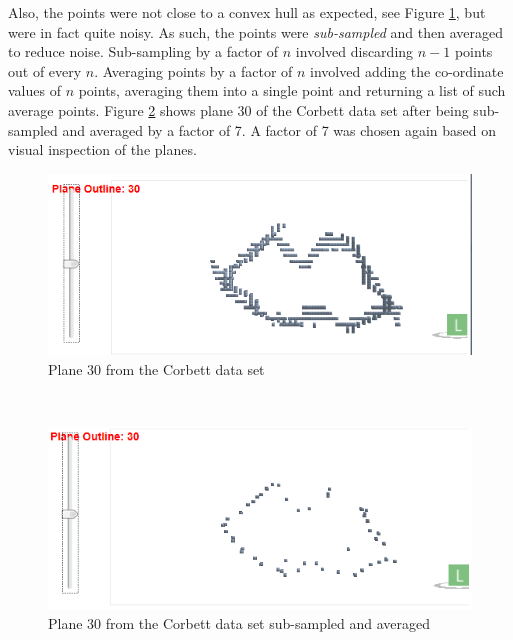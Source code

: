 Also, the points were not close to a convex hull as expected, see Figure \ref{slice 30 from the corbett data set}, but were in fact quite noisy. As such, the points were \emph{sub-sampled} and then averaged to reduce noise. Sub-sampling by a factor of $n$ involved discarding $n-1$ points out of every $n$. Averaging points by a factor of $n$ involved adding the co-ordinate values of $n$ points, averaging them into a single point and returning a list of such average points. Figure \ref{plane 30 from the corbett data set sub-sampled and averaged} shows plane 30 of the Corbett data set after being sub-sampled and averaged by a factor of 7. A factor of 7 was chosen again based on visual inspection of the planes.\\

\begin{figure}[htb]
\begin{center}
\includegraphics[scale=0.4]{images/notasexpected} 
\end{center}
\caption{Plane 30 from the Corbett data set}
\label{slice 30 from the corbett data set}
\end{figure} \\

\begin{figure}[htb]
\begin{center}
\includegraphics[scale=0.4]{images/improved} 
\end{center}
\caption{Plane 30 from the Corbett data set sub-sampled and averaged}
\label{plane 30 from the corbett data set sub-sampled and averaged}
\end{figure} \\


